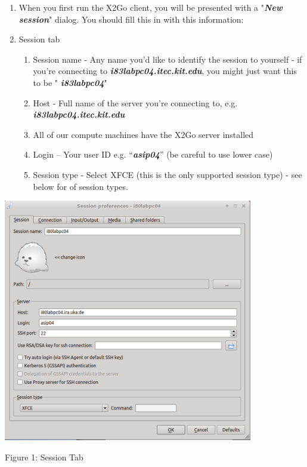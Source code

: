 \documentclass{article}
\begin{document}
\begin{enumerate}
\def\labelenumi{\arabic{enumi}.}
\setcounter{enumi}{3}
\item
  When you first run the X2Go client, you will be presented with a
  "\emph{\textbf{New session}}" dialog. You should fill this in with
  this information:
\item
  Session tab

  \begin{enumerate}
  \def\labelenumii{\arabic{enumii}.}
  \item
    Session name - Any name you'd like to identify the session to
    yourself - if you're connecting to
    \emph{\textbf{i83labpc04.itec.kit.edu}}, you might just want this to
    be " \emph{\textbf{i83labpc04}}"
  \item
    Host - Full name of the server you're connecting to, e.g.
    \emph{\textbf{i83labpc04.itec.kit.edu}}
  \item
    All of our compute machines have the X2Go server installed
  \item
    Login -- Your user ID e.g. ``\emph{\textbf{asip04}}'' (be careful to
    use lower case)
  \item
    Session type - Select XFCE (this is the only supported session type)
    - see below for of session types.
  \end{enumerate}
\end{enumerate}

\includegraphics[width=4.28968in,height=4.17836in]{images/media/image1.png}

Figure 1: Session Tab
\end{document}
